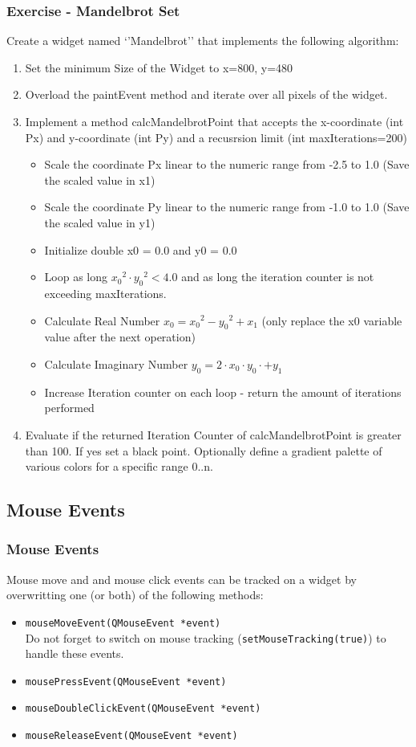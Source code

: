 \begin{frame}[fragile]
\frametitle{Exercise - Mandelbrot Set}
Create a widget named `'Mandelbrot'' that implements the following algorithm:
{\small
\begin{enumerate}
\item Set the minimum Size of the Widget to x=800, y=480
\item Overload the paintEvent method and iterate over all pixels of the widget. 
\item Implement a method calcMandelbrotPoint that accepts the x-coordinate (int Px) and y-coordinate (int Py) and a recusrsion limit (int maxIterations=200)
	\begin{itemize}
	\item Scale the coordinate Px linear to the numeric range from -2.5 to 1.0 (Save the scaled value in x1)
	\item Scale the coordinate Py linear to the numeric range from -1.0 to 1.0 (Save the scaled value in y1)
	\item Initialize double x0 = 0.0 and y0 = 0.0
	\item Loop as long ${x_0}^2 \cdot {y_0}^2 < 4.0$ and as long the iteration counter is not exceeding maxIterations.
	\item Calculate Real Number $x_0 = {x_0}^2 - {y_0}^2 + x_1$ (only replace the x0 variable value after the next operation)
	\item Calculate Imaginary Number $y_0 = 2 \cdot  x_0 \cdot y_0  \cdot + y_1$ 
	\item Increase Iteration counter on each loop - return the amount of iterations performed
	\end{itemize}
\item Evaluate if the returned Iteration Counter of calcMandelbrotPoint is greater than 100. If yes set a black point. Optionally define a gradient palette of various colors for a specific range 0..n.
\end{enumerate}
}
\end{frame}

\subsection{Mouse Events}
\begin{frame}[fragile]
\frametitle{Mouse Events}
Mouse move and and mouse click events can be tracked on a widget by
overwritting one (or both) of the following methods:

\begin{itemize}
\item \verb|mouseMoveEvent(QMouseEvent *event)|\\
Do not forget to switch on mouse tracking (\verb|setMouseTracking(true)|) to handle these events.
\item \verb|mousePressEvent(QMouseEvent *event)|
\item \verb|mouseDoubleClickEvent(QMouseEvent *event)|
\item \verb|mouseReleaseEvent(QMouseEvent *event)|
\end{itemize}

\end{frame}

